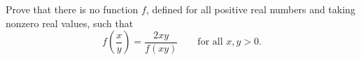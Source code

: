 Prove that there is no function $f$, defined for all positive real numbers and taking nonzero real values, such that
\[f\left(\dfrac xy\right)=\dfrac{2xy}{f(xy)}\qquad\text{for all }x,y>0.\]
